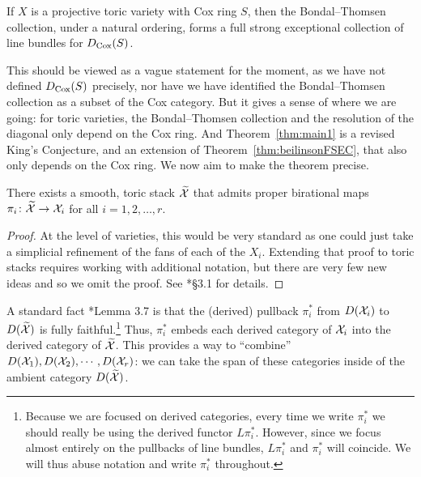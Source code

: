 \documentclass{amsart}
\begin{document}
\begin{thm}\label{thm:main1}
If $X$ is a projective toric variety with Cox ring $S$, then the Bondal--Thomsen collection, under a natural ordering, forms a full strong exceptional collection of line bundles for $D_{\operatorname{Cox}}(S)$.
\end{thm}

This should be viewed as a vague statement for the moment, as we have not defined $D_{\operatorname{Cox}}(S)$ precisely, nor have we have identified the Bondal--Thomsen collection as a subset of the Cox category.  But it gives a sense of where we are going: for toric varieties, the Bondal--Thomsen collection and the resolution of the diagonal only depend on the Cox ring.  And Theorem~\ref{thm:main1} is a revised King's Conjecture, and an extension of Theorem~\ref{thm:beilinsonFSEC}, that also only depends on the Cox ring. We now aim to make the theorem precise.
\begin{lemma}\label{lem:TildeX}
    There exists a smooth, toric stack $\widetilde{\mathcal X}$ that admits proper birational maps $\pi_i\colon \widetilde{\mathcal X} \to \mathcal X_i$ for all $i=1,2,\dots,r$.
\end{lemma}
\begin{proof}
    At the level of varieties, this would be very standard as one could just take a simplicial refinement of the fans of each of the $X_i$.  Extending that proof to toric stacks requires working with additional notation, but there are very few new ideas and so we omit the proof.  See \cite{BBB+24}*{\S 3.1} for details.
\end{proof}

A standard fact \cite{BBB+24}*{Lemma 3.7} is that the (derived) pullback $\pi_i^*$ from $D(\mathcal X_i)$ to $D(\widetilde{\mathcal X})$ is fully faithful.\footnote{Because we are focused on derived categories, every time we write $\pi_i^*$ we should really be using the derived functor $L\pi_i^*$.  However, since we focus almost entirely on the pullbacks of line bundles, $L\pi_i^*$ and $\pi_i^*$ will coincide.  We will thus abuse notation and write $\pi_i^*$ throughout.}  Thus, $\pi_i^*$ embeds each derived category of $\mathcal X_i$ into the derived category of $\widetilde{\mathcal X}$.
This provides a way to ``combine'' $D(\mathcal X_1), D(\mathcal X_2), \cdots, D(\mathcal X_r)$: we can take the span of these categories inside of the ambient category $D(\widetilde{\mathcal X})$.
\end{document}
